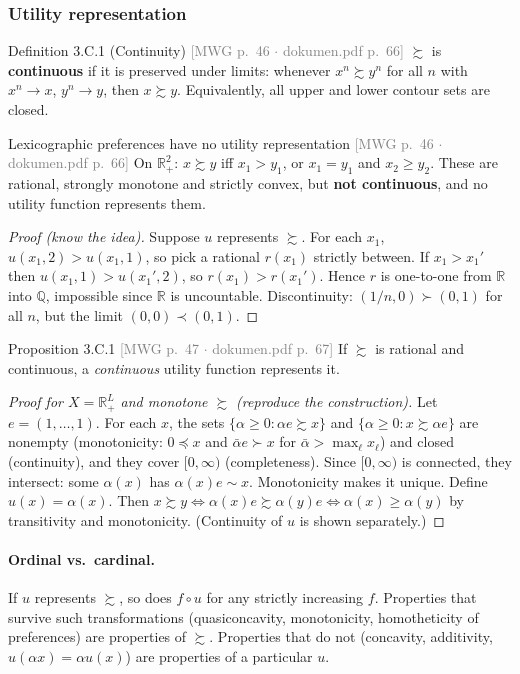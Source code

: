 \documentclass[11pt]{article}
\newcommand{\R}{\mathbb{R}}
\newcommand{\pref}{\succsim}
\newcommand{\spref}{\succ}
\newcommand{\ind}{\sim}
\newcommand{\mwg}[2]{\hfill{\small\textcolor{gray}{[MWG p.~#1 $\cdot$ dokumen.pdf p.~#2]}}}
\begin{document}
\subsubsection{Utility representation}
\begin{defn}{Definition 3.C.1 (Continuity) \mwg{46}{66}}
$\pref$ is \textbf{continuous} if it is preserved under limits: whenever $x^n\pref y^n$ for all $n$ with $x^n\to x$, $y^n\to y$, then $x\pref y$. Equivalently, all upper and lower contour sets are closed.
\end{defn}

\begin{prop}{Lexicographic preferences have no utility representation \mwg{46}{66}}
On $\R^2_+$: $x\pref y$ iff $x_1>y_1$, or $x_1=y_1$ and $x_2\ge y_2$. These are rational, strongly monotone and strictly convex, but \textbf{not continuous}, and no utility function represents them.
\end{prop}
\begin{proof}[Proof (know the idea)]
Suppose $u$ represents $\pref$. For each $x_1$, $u(x_1,2)>u(x_1,1)$, so pick a rational $r(x_1)$ strictly between. If $x_1>x_1'$ then $u(x_1,1)>u(x_1',2)$, so $r(x_1)>r(x_1')$. Hence $r$ is one-to-one from $\R$ into $\mathbb{Q}$, impossible since $\R$ is uncountable.
Discontinuity: $(1/n,0)\spref(0,1)$ for all $n$, but the limit $(0,0)\prec(0,1)$.
\end{proof}

\begin{prop}{Proposition 3.C.1 \mwg{47}{67}}
If $\pref$ is rational and continuous, a \emph{continuous} utility function represents it.
\end{prop}
\begin{proof}[Proof for $X=\R^L_+$ and monotone $\pref$ (reproduce the construction)]
Let $e=(1,\dots,1)$. For each $x$, the sets $\{\alpha\ge0:\alpha e\pref x\}$ and $\{\alpha\ge0:x\pref\alpha e\}$ are nonempty (monotonicity: $0\preceq x$ and $\bar\alpha e\spref x$ for $\bar\alpha>\max_\ell x_\ell$) and closed (continuity), and they cover $[0,\infty)$ (completeness). Since $[0,\infty)$ is connected, they intersect: some $\alpha(x)$ has $\alpha(x)e\ind x$. Monotonicity makes it unique. Define $u(x)=\alpha(x)$. Then $x\pref y\iff\alpha(x)e\pref\alpha(y)e\iff\alpha(x)\ge\alpha(y)$ by transitivity and monotonicity. (Continuity of $u$ is shown separately.)
\end{proof}

\paragraph{Ordinal vs.\ cardinal.} If $u$ represents $\pref$, so does $f\circ u$ for any strictly increasing $f$. Properties that survive such transformations (quasiconcavity, monotonicity, homotheticity of preferences) are properties of $\pref$. Properties that do not (concavity, additivity, $u(\alpha x)=\alpha u(x)$) are properties of a particular $u$.
\end{document}
